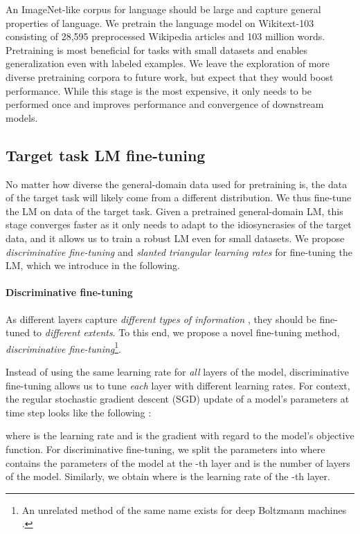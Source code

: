 \documentclass[11pt,a4paper]{article}
\begin{document}
An ImageNet-like corpus for language should be large and capture general properties of language. We pretrain the language model on Wikitext-103 \cite{Merity2016} consisting of 28,595 preprocessed Wikipedia articles and 103 million words. Pretraining is most beneficial for tasks with small datasets and enables generalization even with  labeled examples. We leave the exploration of more diverse pretraining corpora to future work, but expect that they would boost performance. While this stage is the most expensive, it only needs to be performed once and improves performance and convergence of downstream models.

\subsection{Target task LM fine-tuning} \label{sec:lm-fine-tuning}

No matter how diverse the general-domain data used for pretraining is, the data of the target task will likely come from a different distribution. We thus fine-tune the LM on data of the target task. Given a pretrained general-domain LM, this stage converges faster as it only needs to adapt to the idiosyncrasies of the target data, and it allows us to train a robust LM even for small datasets. We propose \emph{discriminative fine-tuning } and \emph{slanted triangular learning rates} for fine-tuning the LM, which we introduce in the following.

\paragraph{Discriminative fine-tuning}

As different layers capture \emph{different types of information} \cite{yosinski2014transferable}, they should be fine-tuned to \emph{different extents}.
To this end, we propose a novel fine-tuning method, \emph{discriminative fine-tuning}\footnote{
An unrelated method of the same name exists for deep Boltzmann machines \cite{salakhutdinov2009deep}.}.

Instead of using the same learning rate for \emph{all} layers of the model, discriminative fine-tuning allows us to tune \emph{each} layer with different learning rates. For context, the regular stochastic gradient descent (SGD) update of a model's parameters  at time step  looks like the following \cite{ruder2016overview}:

where  is the learning rate and  is the gradient with regard to the model's objective function. For discriminative fine-tuning, we split the parameters  into  where  contains the parameters of the model at the -th layer and  is the number of layers of the model. Similarly, we obtain  where  is the learning rate of the -th layer.
\end{document}
